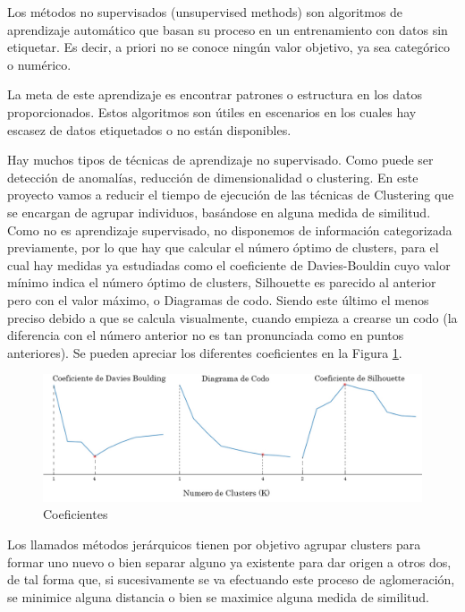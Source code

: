 	Los métodos no supervisados (unsupervised methods) son algoritmos de aprendizaje automático que basan su proceso en un entrenamiento con datos sin etiquetar. Es decir, a priori no se conoce ningún valor objetivo, ya sea categórico o numérico. 
	
	La meta de este aprendizaje es encontrar patrones o estructura en los datos proporcionados. Estos algoritmos son útiles en escenarios en los cuales hay escasez de datos etiquetados o no están disponibles.
	
	Hay muchos tipos de técnicas de aprendizaje no supervisado. Como puede ser detección de anomalías, reducción de dimensionalidad o clustering. En este proyecto vamos a reducir el tiempo de ejecución de las técnicas de Clustering que se encargan de agrupar individuos, basándose en alguna medida de similitud. Como no es aprendizaje supervisado, no disponemos de información categorizada previamente, por lo que hay que calcular el número óptimo de clusters, para el cual hay medidas ya estudiadas como el coeficiente de Davies-Bouldin cuyo valor mínimo indica el número óptimo de clusters, Silhouette es parecido al anterior pero con el valor máximo, o Diagramas de codo. Siendo este último el menos preciso debido a que se calcula visualmente, cuando empieza a crearse un codo (la diferencia con el número anterior no es tan pronunciada como en puntos anteriores). Se pueden apreciar los diferentes coeficientes en la Figura \ref{fig:coeficientes}. 


	\begin{figure}[!h]
		\centering
		\includegraphics[width=1\textwidth]{images/chapter_2/ap_nosup_diagramas}
		\caption{Coeficientes}
		\label{fig:coeficientes}
	\end{figure}


	Los llamados métodos jerárquicos \cite{ackermann2014analysis} tienen por objetivo agrupar clusters para formar uno nuevo o bien separar alguno ya existente para dar origen a otros dos, de tal forma que, si sucesivamente se va efectuando este proceso de aglomeración, se minimice alguna distancia o bien se maximice alguna medida de similitud.


